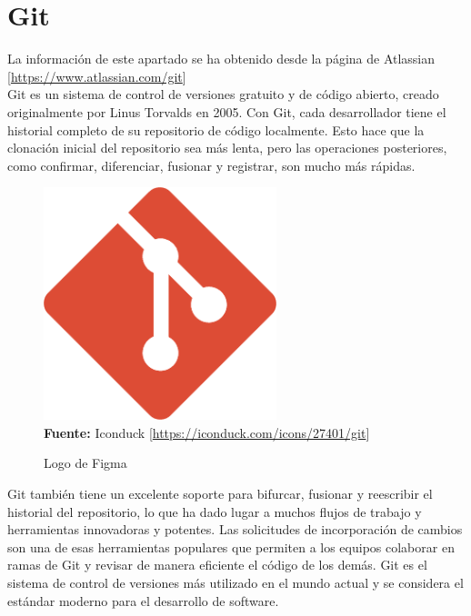 \section{Git}
La información de este apartado se ha obtenido desde la página de Atlassian
    [\url{https://www.atlassian.com/git}] \\

Git es un sistema de control de versiones gratuito y de código abierto, creado
originalmente por Linus Torvalds en 2005. Con Git, cada desarrollador tiene el
historial completo de su repositorio de código localmente. Esto hace que la
clonación inicial del repositorio sea más lenta, pero las operaciones
posteriores, como confirmar, diferenciar, fusionar y registrar, son mucho más
rápidas.
\begin{figure}[htb!]
    \centering
    \caption{Logo de Figma}\label{fig:git-logo}
    \centering
    \includegraphics[scale=0.25]{./Ilustraciones/logos/git-logo.png}\\
    \textbf{Fuente:} Iconduck [\url{https://iconduck.com/icons/27401/git}]
\end{figure}

Git también tiene un excelente soporte para bifurcar, fusionar y reescribir el
historial del repositorio, lo que ha dado lugar a muchos flujos de trabajo y
herramientas innovadoras y potentes. Las solicitudes de incorporación de
cambios son una de esas herramientas populares que permiten a los equipos
colaborar en ramas de Git y revisar de manera eficiente el código de los demás.
Git es el sistema de control de versiones más utilizado en el mundo actual y se
considera el estándar moderno para el desarrollo de software.

